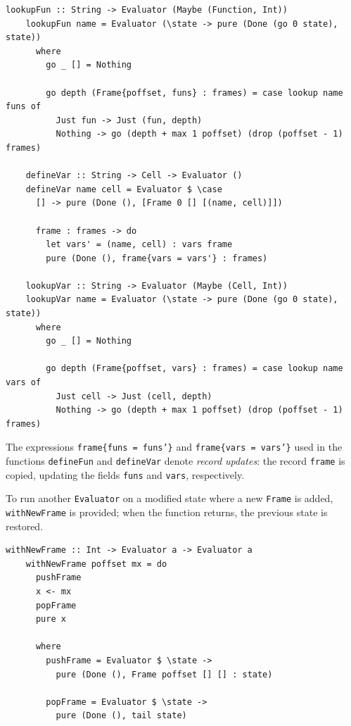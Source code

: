 \documentclass[UdineBachThesis,american,11pt]{PhdThesis}
\begin{document}
  \begin{Verbatim}[gobble=4,fontsize=\small]
    lookupFun :: String -> Evaluator (Maybe (Function, Int))
    lookupFun name = Evaluator (\state -> pure (Done (go 0 state), state))
      where
        go _ [] = Nothing

        go depth (Frame{poffset, funs} : frames) = case lookup name funs of
          Just fun -> Just (fun, depth)
          Nothing -> go (depth + max 1 poffset) (drop (poffset - 1) frames)

    defineVar :: String -> Cell -> Evaluator ()
    defineVar name cell = Evaluator $ \case
      [] -> pure (Done (), [Frame 0 [] [(name, cell)]])

      frame : frames -> do
        let vars' = (name, cell) : vars frame
        pure (Done (), frame{vars = vars'} : frames)

    lookupVar :: String -> Evaluator (Maybe (Cell, Int))
    lookupVar name = Evaluator (\state -> pure (Done (go 0 state), state))
      where
        go _ [] = Nothing

        go depth (Frame{poffset, vars} : frames) = case lookup name vars of
          Just cell -> Just (cell, depth)
          Nothing -> go (depth + max 1 poffset) (drop (poffset - 1) frames)
  \end{Verbatim}

  The expressions \mbox{\texttt{frame\{funs = funs'\}}} and
  \mbox{\texttt{frame\{vars = vars'\}}} used in the functions
  \mbox{\texttt{defineFun}} and \mbox{\texttt{defineVar}} denote \emph{record
  updates}: the record \mbox{\texttt{frame}} is copied, updating the fields
  \mbox{\texttt{funs}} and \mbox{\texttt{vars}}, respectively.

  To run another \mbox{\texttt{Evaluator}} on a modified state where a new
  \mbox{\texttt{Frame}} is added, \mbox{\texttt{withNewFrame}} is provided; when
  the function returns, the previous state is restored.

  \begin{Verbatim}[gobble=4,fontsize=\small]
    withNewFrame :: Int -> Evaluator a -> Evaluator a
    withNewFrame poffset mx = do
      pushFrame
      x <- mx
      popFrame
      pure x

      where
        pushFrame = Evaluator $ \state ->
          pure (Done (), Frame poffset [] [] : state)

        popFrame = Evaluator $ \state ->
          pure (Done (), tail state)
  \end{Verbatim}
\end{document}
